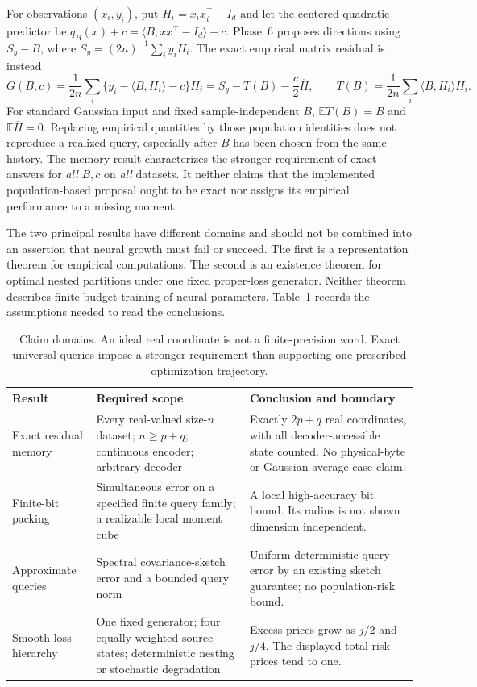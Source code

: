 \documentclass[11pt]{article}
\theoremstyle{remark}
\newcommand{\E}{\mathbb E}
\begin{document}
For observations $(x_i,y_i)$, put $H_i=x_ix_i^\top-I_d$ and let
the centered quadratic predictor be
$q_B(x)+c=\langle B,xx^\top-I_d\rangle+c$.
Phase~6 proposes directions using $S_y-B$, where
$S_y=(2n)^{-1}\sum_i y_iH_i$. The exact empirical matrix residual is
instead
\begin{equation}
 G(B,c)=\frac1{2n}\sum_i\{y_i-\langle B,H_i\rangle-c\}H_i
 =S_y-T(B)-\frac c2\overline H,
 \qquad T(B)=\frac1{2n}\sum_i\langle B,H_i\rangle H_i.
 \label{eq:intro-residual}
\end{equation}
For standard Gaussian input and fixed sample-independent $B$,
$\E T(B)=B$ and $\E\overline H=0$. Replacing empirical quantities
by those population identities does not reproduce a realized query,
especially after $B$ has been chosen from the same history. The
memory result characterizes the stronger requirement of exact
answers for \emph{all} $B,c$ on \emph{all} datasets. It neither
claims that the implemented population-based proposal ought to be
exact nor assigns its empirical performance to a missing moment.

The two principal results have different domains and should not be
combined into an assertion that neural growth must fail or succeed.
The first is a representation theorem for empirical computations.
The second is an existence theorem for optimal nested partitions
under one fixed proper-loss generator. Neither theorem describes
finite-budget training of neural parameters. Table~\ref{tab:scope}
records the assumptions needed to read the conclusions.

\begin{table}[t]
\centering\small
\begin{tabularx}{\linewidth}{@{}>{\raggedright\arraybackslash}p{.19\linewidth}XX@{}}
\toprule
Result & Required scope & Conclusion and boundary\\
\midrule
Exact residual memory & Every real-valued size-$n$ dataset;
$n\ge p+q$; continuous encoder; arbitrary decoder & Exactly
$2p+q$ real coordinates, with all decoder-accessible state counted.
No physical-byte or Gaussian average-case claim.\\[4pt]
Finite-bit packing & Simultaneous error on a specified finite query
family; a realizable local moment cube & A local high-accuracy bit
bound. Its radius is not shown dimension independent.\\[4pt]
Approximate queries & Spectral covariance-sketch error and a bounded
query norm & Uniform deterministic query error by an existing
sketch guarantee; no population-risk bound.\\[4pt]
Smooth-loss hierarchy & One fixed generator; four equally weighted
source states; deterministic nesting or stochastic degradation &
Excess prices grow as $j/2$ and $j/4$. The displayed total-risk
prices tend to one.\\
\bottomrule
\end{tabularx}
\caption{Claim domains. An ideal real coordinate is not a finite-precision
word. Exact universal queries impose a stronger requirement than
supporting one prescribed optimization trajectory.}
\label{tab:scope}
\end{table}
\end{document}
